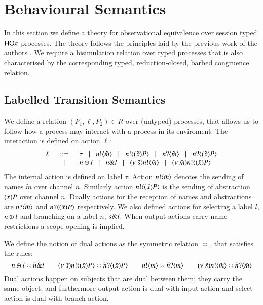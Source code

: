 \section{Behavioural Semantics}
\label{sec:beh_sem}

In this section we define a theory for observational equivalence over
session typed $\mathsf{HO}\pi$ processes. The theory follows the principles
laid by the previous work of the authors
\cite{DBLP:conf/forte/KouzapasYH11,KY13,dkphdthesis}.
We require a bisimulation relation over typed processes that
is also characterised by the corresponding typed, reduction-closed,
barbed congruence relation.


\subsection{Labelled Transition Semantics}

We define a relation $(P_1, \ell, P_2) \in R$ over
(untyped) processes, that allows us to follow how a process may
interact with a process in its enviroment. The interaction
is defined on action $\ell$:
%
\[
\begin{array}{rcl}
		\ell	& \;\;::=\;\;  & \tau \;\;\;|\;\;\; n ! \langle \tilde{m} \rangle \;\;\;|\;\;\; n ! \langle (\tilde{x})P \rangle \;\;\;|\;\;\;n ? \langle \tilde{m} \rangle \;\;\;|\;\;\; n ? \langle (\tilde{x})P \rangle \\
			& \;\;\;|\;\;\; & n \oplus l \;\;\;|\;\;\; n \& l \;\;\;|\;\;\; (\nu\ \tilde{s}) n ! \langle \tilde{m} \rangle \;\;\;|\;\;\; (\nu\ \tilde{m}) n ! \langle (\tilde{x})P \rangle
\end{array}
\]
%
\noi The internal action is defined on label $\tau$.
Action $n ! \langle \tilde{m} \rangle$ denotes the sending of names $\tilde{m}$ over channel $n$.
Similarly action $n ! \langle (\tilde{x})P \rangle$ is the sending of abstraction $(\tilde{x})P$
over channel $n$. Dually actions for the reception of names and abstractions are
$n ? \langle \tilde{m} \rangle$ and $n ? \langle (\tilde{x})P \rangle$ respectively. We also defined
actions for selecting a label $l$, $n \oplus l$ and branching on a label
$n$, $s \& l$. When output actions carry name restrictions a scope
opening is implied.

We define the notion of dual actions as the symmetric relation $\asymp$, that satisfies the rules:
%
\[
	n \oplus l \asymp \overline{n} \& l
	\qquad
	(\nu\ \tilde{s}) n ! \langle (\tilde{x})P \rangle \asymp \overline{n} ? \langle (\tilde{x})P \rangle
	\qquad
	n ! \langle m \rangle \asymp \overline{n} ? \langle m \rangle
	\qquad
	(\nu\ \tilde{s}) n ! \langle \tilde{m} \rangle \asymp \overline{n} ? \langle \tilde{m} \rangle
\]
%
Dual actions happen on subjects that are dual between them; they carry the same
object; and furthermore output action is dual with input action and 
select action is dual with branch action.

